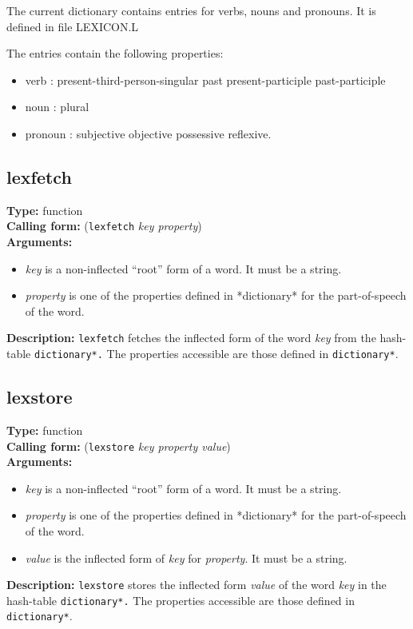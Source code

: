 \documentclass[10pt,a4paper]{report}
\begin{document}
The current dictionary contains entries for verbs, nouns and
pronouns. It is defined in file LEXICON.L 

The entries contain the following properties:
\begin{itemize}
\item verb : present-third-person-singular past present-participle past-participle

\item noun : plural

\item pronoun : subjective objective possessive reflexive.
\end{itemize}


\subsection{lexfetch}
{\bf Type:} function
\\{\bf Calling form:} ({\tt lexfetch} {\em key property})
\\{\bf Arguments:}
\begin{itemize}
\item {\em key} is a non-inflected ``root'' form of a word. It must be a
string.

\item {\em property} is one of the properties defined in *dictionary* for
the part-of-speech of the word.
\end{itemize}
{\bf Description: } {\tt lexfetch} fetches the inflected form of the
word {\em key} from the hash-table {\tt *dictionary*.} The properties
accessible are those defined in {\tt *dictionary*}.


\subsection{lexstore}
{\bf Type:} function
\\{\bf Calling form:} ({\tt lexstore} {\em key property value})
\\{\bf Arguments:}
\begin{itemize}
\item {\em key} is a non-inflected ``root'' form of a word. It must be a
string.

\item {\em property} is one of the properties defined in *dictionary* for
the part-of-speech of the word.

\item {\em value} is the inflected form of {\em key} for {\em property}. It
must be a string.
\end{itemize}
{\bf Description: } {\tt lexstore}  stores the inflected form {\em value} of the
word {\em key} in the hash-table {\tt *dictionary*.} The properties
accessible are those defined in {\tt *dictionary*}.
\end{document}
